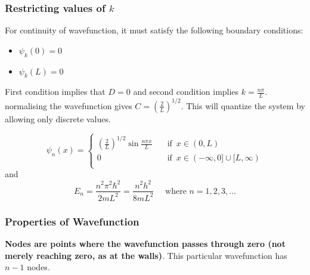 \documentclass[11pt]{article}
\theoremstyle{definition}
\begin{document}
\subsubsection{Restricting values of $k$}

For continuity of wavefunction, it must satisfy the following boundary conditions:
\begin{itemize}
    \item $\psi_k (0) = 0$
    \item $\psi_k (L) = 0$
\end{itemize}

First condition implies that $D=0$ and second condition implies $k = \frac{n\pi}{L}$. normalising the wavefunction gives $C = \left(\frac{2}{L}\right)^{1/2}$. This will quantize the system by allowing only discrete values.
\begin{shaded}
\begin{equation*}
\psi_n(x) =\begin{cases}
          \left(\frac{2}{L}\right)^{1/2}\sin{\frac{n\pi x}{L}} \quad &\text{if } \, x \in (0,L) \\
          0 \quad &\text{if } \, x \in (-\infty,0] \cup [L, \infty) \\
     \end{cases}
\end{equation*}
and 
\begin{equation*}
    E_n = \frac{n^2 \pi^2 \hbar^2}{2mL^2} = \frac{n^2 h^2}{8mL^2} \quad  \text{ where }n=1,2,3,\dots
\end{equation*}
\end{shaded}
\subsubsection{Properties of Wavefunction}
\textbf{Nodes are points where the wavefunction passes through zero (not merely reaching zero, as at the walls)}. This particular wavefunction has $n-1$ nodes.

\end{document}
